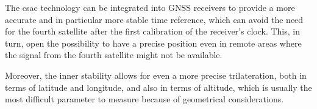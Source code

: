 The \acrshort{csac} technology can be integrated into GNSS receivers to provide a more accurate and in particular more stable time reference, which can avoid the need for the fourth satellite after the first calibration of the receiver's clock.
This, in turn, open the possibility to have a precise position even in remote areas where the signal from the fourth satellite might not be available.

Moreover, the inner stability allows for even a more precise trilateration, both in terms of latitude and longitude, and also in terms of altitude, which is usually the most difficult parameter to measure because of geometrical considerations.
